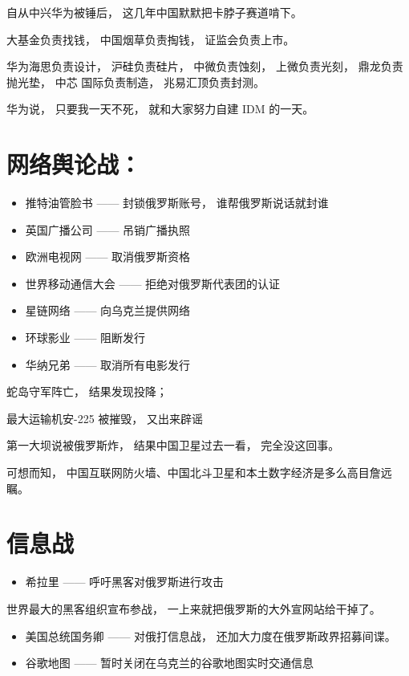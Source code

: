 \documentclass[UTF8, 11pt, oneside]{ctexart}
\begin{document}
自从中兴华为被锤后， 这几年中国默默把卡脖子赛道啃下。

大基金负责找钱， 中国烟草负责掏钱， 证监会负责上市。

华为海思负责设计， 沪硅负责硅片， 中微负责蚀刻， 上微负责光刻， 鼎龙负责抛光垫， 中芯
国际负责制造， 兆易汇顶负责封测。

华为说， 只要我一天不死， 就和大家努力自建 IDM 的一天。


\section{网络舆论战：}

\begin{itemize}
    \item 推特油管脸书 —— 封锁俄罗斯账号， 谁帮俄罗斯说话就封谁
    \item 英国广播公司 —— 吊销广播执照
    \item 欧洲电视网 —— 取消俄罗斯资格
    \item 世界移动通信大会 —— 拒绝对俄罗斯代表团的认证
    \item 星链网络 —— 向乌克兰提供网络
    \item 环球影业 —— 阻断发行
    \item 华纳兄弟 —— 取消所有电影发行
\end{itemize}

蛇岛守军阵亡， 结果发现投降；

最大运输机安-225 被摧毁， 又出来辟谣

第一大坝说被俄罗斯炸， 结果中国卫星过去一看， 完全没这回事。

可想而知， 中国互联网防火墙、中国北斗卫星和本土数字经济是多么高目詹远瞩。


\section{信息战}

\begin{itemize}
    \item 希拉里 —— 呼吁黑客对俄罗斯进行攻击
\end{itemize}

世界最大的黑客组织宣布参战， 一上来就把俄罗斯的大外宣网站给干掉了。

\begin{itemize}
    \item 美国总统国务卿 —— 对俄打信息战， 还加大力度在俄罗斯政界招募间谍。
    \item 谷歌地图 —— 暂时关闭在乌克兰的谷歌地图实时交通信息
\end{itemize}
\end{document}
